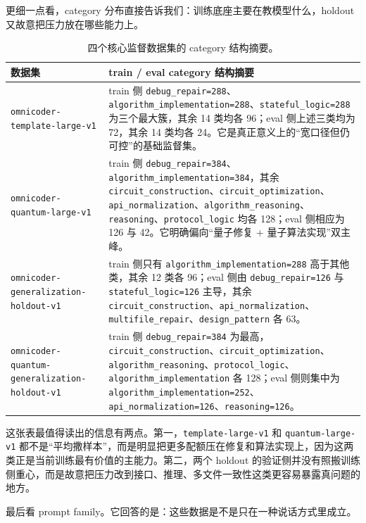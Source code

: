 \documentclass[11pt,a4paper]{article}
\newcommand{\code}[1]{\begingroup\ttfamily\footnotesize\nolinkurl{#1}\endgroup}
\begin{document}
更细一点看，category 分布直接告诉我们：训练底座主要在教模型什么，holdout 又故意把压力放在哪些能力上。

\begin{table}[htbp]
\centering
\small
\begin{tabularx}{\textwidth}{p{3.3cm} Y}
\toprule
数据集 & train / eval category 结构摘要 \\
\midrule
\code{omnicoder-template-large-v1} & train 侧 \code{debug\_repair=288}、\code{algorithm\_implementation=288}、\code{stateful\_logic=288} 为三个最大簇，其余 14 类均各 96；eval 侧上述三类均为 72，其余 14 类均各 24。它是真正意义上的“宽口径但仍可控”的基础监督集。 \\
\code{omnicoder-quantum-large-v1} & train 侧 \code{debug\_repair=384}、\code{algorithm\_implementation=384}，其余 \code{circuit\_construction}、\code{circuit\_optimization}、\code{api\_normalization}、\code{algorithm\_reasoning}、\code{reasoning}、\code{protocol\_logic} 均各 128；eval 侧相应为 126 与 42。它明确偏向“量子修复 + 量子算法实现”双主峰。 \\
\code{omnicoder-generalization-holdout-v1} & train 侧只有 \code{algorithm\_implementation=288} 高于其他类，其余 12 类各 96；eval 侧由 \code{debug\_repair=126} 与 \code{stateful\_logic=126} 主导，其余 \code{circuit\_construction}、\code{api\_normalization}、\code{multifile\_repair}、\code{design\_pattern} 各 63。 \\
\code{omnicoder-quantum-generalization-holdout-v1} & train 侧 \code{debug\_repair=384} 为最高，\code{circuit\_construction}、\code{circuit\_optimization}、\code{algorithm\_reasoning}、\code{protocol\_logic}、\code{algorithm\_implementation} 各 128；eval 侧则集中为 \code{algorithm\_implementation=252}、\code{api\_normalization=126}、\code{reasoning=126}。 \\
\bottomrule
\end{tabularx}
\caption{四个核心监督数据集的 category 结构摘要。}
\label{tab:core-dataset-categories}
\end{table}

这张表最值得读出的信息有两点。第一，\code{template-large-v1} 和 \code{quantum-large-v1} 都不是“平均撒样本”，而是明显把更多配额压在修复和算法实现上，因为这两类正是当前训练最有价值的主能力。第二，两个 holdout 的验证侧并没有照搬训练侧重心，而是故意把压力改到接口、推理、多文件一致性这类更容易暴露真问题的地方。

最后看 prompt family。它回答的是：这些数据是不是只在一种说话方式里成立。
\end{document}
